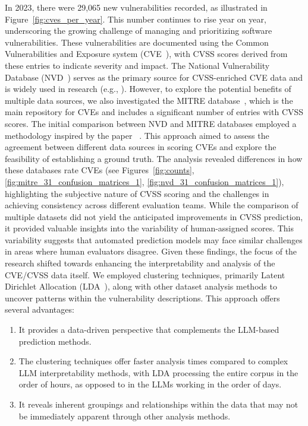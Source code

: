 \documentclass[12pt]{article}
\begin{document}
In 2023, there were 29,065 new vulnerabilities recorded, as illustrated in Figure~\ref{fig:cves_per_year}. This number continues to rise year on year, underscoring the growing challenge of managing and prioritizing software vulnerabilities. These vulnerabilities are documented using the Common Vulnerabilities and Exposure system (CVE~\cite{CVE}), with CVSS scores derived from these entries to indicate severity and impact. The National Vulnerability Database (NVD~\cite{NVD}) serves as the primary source for CVSS-enriched CVE data and is widely used in research (e.g., \cite{costa, nvd_example1, nvd_example2}). However, to explore the potential benefits of multiple data sources, we also investigated the MITRE database~\cite{MITRE}, which is the main repository for CVEs and includes a significant number of entries with CVSS scores. The initial comparison between NVD and MITRE databases employed a methodology inspired by the paper ~\cite{bayes}. This approach aimed to assess the agreement between different data sources in scoring CVEs and explore the feasibility of establishing a ground truth. The analysis revealed differences in how these databases rate CVEs (see Figures~\ref{fig:counts}, \ref{fig:mitre_31_confusion_matrices_1}, \ref{fig:nvd_31_confusion_matrices_1}), highlighting the subjective nature of CVSS scoring and the challenges in achieving consistency across different evaluation teams. While the comparison of multiple datasets did not yield the anticipated improvements in CVSS prediction, it provided valuable insights into the variability of human-assigned scores. This variability suggests that automated prediction models may face similar challenges in areas where human evaluators disagree. Given these findings, the focus of the research shifted towards enhancing the interpretability and analysis of the CVE/CVSS data itself. We employed clustering techniques, primarily Latent Dirichlet Allocation (LDA~\cite{lda_origin}), along with other dataset analysis methods to uncover patterns within the vulnerability descriptions. This approach offers several advantages:

\begin{enumerate}

	\item It provides a data-driven perspective that complements the LLM-based prediction methods.

	\item The clustering techniques offer faster analysis times compared to complex LLM interpretability
	      methods, with LDA processing the entire corpus in the order of hours, as opposed to in
	      the LLMs working in the order of days.

	\item It reveals inherent groupings and relationships within the data that may not be immediately apparent
	      through other analysis methods.

\end{enumerate}
\end{document}
